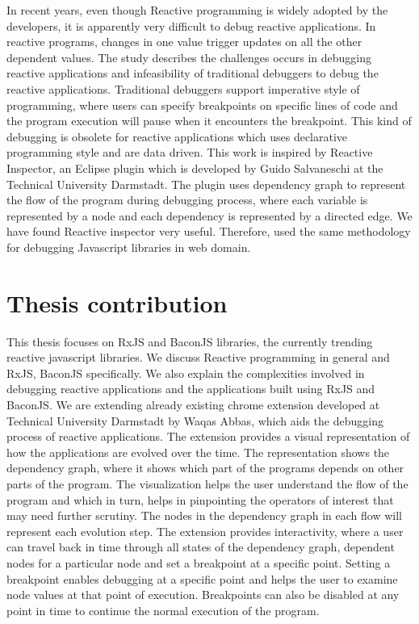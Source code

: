 In recent years, even though Reactive programming is widely adopted by the developers, it is apparently very difficult to debug reactive applications. 
In reactive programs, changes in one value trigger updates on all the other dependent values. The study\cite{Salvaneschi:2016:DRP:2889160.2893174} describes the challenges occurs in debugging reactive applications and infeasibility of traditional debuggers to debug the reactive applications. Traditional debuggers support imperative style of programming, where users can specify breakpoints on specific lines of code and the program execution will pause when it encounters the breakpoint. 
This kind of debugging is obsolete for reactive applications which uses declarative programming style and are data driven. 
This work is inspired by Reactive Inspector\cite{reactiveInspector}, an Eclipse plugin which is developed by Guido Salvaneschi at the Technical University Darmstadt. 
The plugin uses dependency graph to represent the flow of the program during debugging process, where each variable is represented by a node and each dependency is represented by a directed edge.
We have found Reactive inspector very useful. Therefore, used the same methodology for debugging Javascript libraries in web domain.

\section{Thesis contribution}

This thesis focuses on RxJS and BaconJS libraries, the currently trending reactive javascript libraries. 
We discuss Reactive programming in general and RxJS, BaconJS specifically.
We also explain the complexities involved in debugging reactive applications and the applications built using RxJS and BaconJS. 
We are extending already existing chrome extension developed at Technical University Darmstadt by Waqas Abbas\cite{cri}, which aids the debugging process of reactive applications. 
The extension provides a visual representation of how the applications are evolved over the time. 
The representation shows the dependency graph, where it shows which part of the programs depends on other parts of the program. 
The visualization helps the user understand the flow of the program and which in turn, helps in pinpointing the operators of interest that may need further scrutiny. 
The nodes in the dependency graph in each flow will represent each evolution step. 
The extension provides interactivity, where a user can travel back in time through all states of the dependency graph, dependent nodes for a particular node and set a breakpoint at a specific point. 
Setting a breakpoint enables debugging at a specific point and helps the user to examine node values at that point of execution. 
Breakpoints can also be disabled at any point in time to continue the normal execution of the program.


